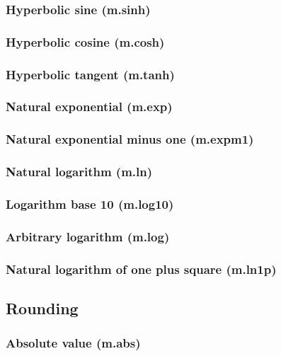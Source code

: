 \documentclass{article}
\theoremstyle{definition}
\begin{document}
\subsubsection{Hyperbolic sine (m.sinh)}

\subsubsection{Hyperbolic cosine (m.cosh)}

\subsubsection{Hyperbolic tangent (m.tanh)}

\subsubsection{Natural exponential (m.exp)}

\subsubsection{Natural exponential minus one (m.expm1)}

\subsubsection{Natural logarithm (m.ln)}

\subsubsection{Logarithm base 10 (m.log10)}

\subsubsection{Arbitrary logarithm (m.log)}

\subsubsection{Natural logarithm of one plus square (m.ln1p)}

\subsection{Rounding}

\subsubsection{Absolute value (m.abs)}
\end{document}

